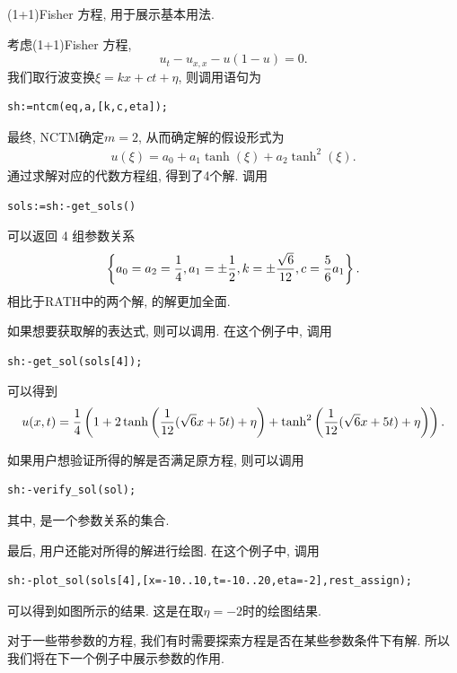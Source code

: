 \begin{example}(1+1)Fisher 方程, 用于展示基本用法.

考虑(1+1)Fisher 方程\cite{guo1991analytic},
\begin{equation}
    u_t-u_{x,x}-u(1-u)=0.
\end{equation}
我们取行波变换$\xi=kx+ct+\eta$, 则调用语句为
\begin{verbatim}
sh:=ntcm(eq,a,[k,c,eta]);
\end{verbatim}
最终, NCTM确定$m=2$, 从而确定解的假设形式为 
\begin{eqnarray}
    u(\xi)=a_0+a_1 \tanh(\xi)+a_2\tanh^2(\xi).
\end{eqnarray}
通过求解对应的代数方程组, 得到了4个解. 调用 
\begin{verbatim}
sols:=sh:-get_sols()
\end{verbatim}
可以返回 4 组参数关系
\begin{equation}
    \left\{a_0=a_2=\frac{1}{4},a_1=\pm \frac{1}{2},k=\pm \frac{\sqrt 6}{12},c=\frac{5}{6}a_1\right\}. \label{para-rel}
\end{equation}
相比于RATH\cite[p35]{liu2001master}中的两个解, 的解更加全面.

如果想要获取解的表达式, 则可以调用. 在这个例子中, 调用
\begin{verbatim}
sh:-get_sol(sols[4]);
\end{verbatim}
可以得到
\begin{equation}
    u(x,t)=\frac{1}{4}\left(1+2\tanh\left(\frac{1}{12}(\sqrt{6}x+5t)+\eta\right)+\tanh^2\left(\frac{1}{12}(\sqrt{6}x+5t)+\eta\right)\right). \label{fisher-sol-4}
\end{equation}

如果用户想验证所得的解是否满足原方程, 则可以调用
\begin{verbatim}
sh:-verify_sol(sol);
\end{verbatim}
其中, 是一个参数关系的集合.

最后, 用户还能对所得的解进行绘图. 在这个例子中, 调用
\begin{verbatim}
sh:-plot_sol(sols[4],[x=-10..10,t=-10..20,eta=-2],rest_assign);
\end{verbatim}
可以得到如图所示的结果. 这是在取$\eta=-2$时的绘图结果. 
    
\end{example}

对于一些带参数的方程, 我们有时需要探索方程是否在某些参数条件下有解. 所以我们将在下一个例子中展示参数的作用.


